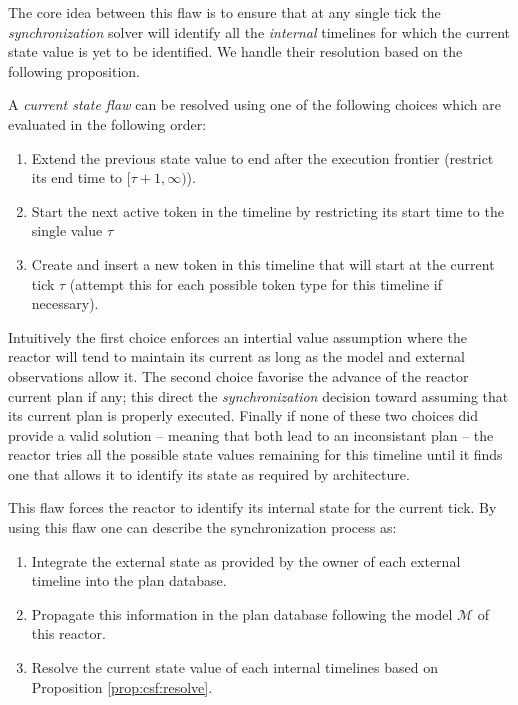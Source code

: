 The core idea between this flaw is to ensure that at any single tick
the {\em synchronization} solver will identify all the {\em internal}
timelines for which the current state value is yet to be
identified. We handle their resolution based on the following
proposition.

\begin{proposition}
  \label{prop:csf:resolve}
  A {\em current state flaw} can be resolved using one of the
  following choices which are evaluated in the following order:

  \begin{enumerate}

  \item Extend the previous state value to end after the execution 
    frontier  (\ie restrict its end time to $[\tau+1, \infty)$). %

  \item Start the next active token in the timeline by restricting its
    start time to the single value $\tau$

  \item Create and insert a new token in this timeline that will start
    at the current tick $\tau$ (attempt this for each possible token
    type for this timeline if necessary).

\end{enumerate}
\end{proposition}
Intuitively the first choice enforces an intertial value assumption
where the reactor will tend to maintain its current as long as the
model and external observations allow it. The second choice favorise
the advance of the reactor current plan if any; this direct the {\em
  synchronization} decision toward assuming that its current plan is
properly executed. Finally if none of these two choices did provide a
valid solution -- meaning that both lead to an inconsistant plan --
the reactor tries all the possible state values remaining for this
timeline until it finds one that allows it to identify its state as
required by \rx architecture.

This flaw forces the reactor to identify its internal state
for the current tick. By using this flaw one can describe the
synchronization process as:

\begin{enumerate}
\item Integrate the external state as provided by the owner of each
  external timeline into the plan database.
\item Propagate this information in the plan database following the
  model $\mathcal{M}$ of this reactor.
\item Resolve the current state value of each internal timelines based
  on Proposition \ref{prop:csf:resolve}.
\end{enumerate}

